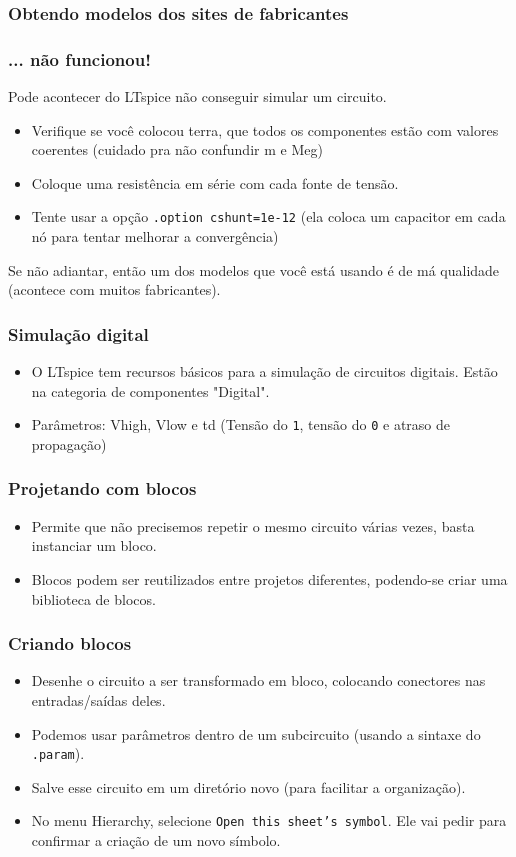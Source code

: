 \documentclass{beamer}
\begin{document}
\begin{frame}
\frametitle{Obtendo modelos dos sites de fabricantes}
\end{frame}

\begin{frame}
\frametitle{... não funcionou!}
Pode acontecer do LTspice não conseguir simular um circuito.
\begin{itemize}
\item Verifique se você colocou terra, que todos os componentes estão com valores coerentes (cuidado pra não confundir m e Meg)
\item Coloque uma resistência em série com cada fonte de tensão.
\item Tente usar a opção \texttt{.option cshunt=1e-12} (ela coloca um capacitor em cada nó para tentar melhorar a convergência)
\end{itemize}
Se não adiantar, então um dos modelos que você está usando é de má qualidade (acontece com muitos fabricantes).
\end{frame}


\begin{frame}
\frametitle{Simulação digital}
\begin{itemize}
\item O LTspice tem recursos básicos para a simulação de circuitos digitais. Estão na categoria de componentes "Digital".
\item Parâmetros: Vhigh, Vlow e td (Tensão do \texttt{1}, tensão do \texttt{0} e atraso de propagação)
\end{itemize}
\end{frame}

\begin{frame}
\frametitle{Projetando com blocos}
\begin{itemize}
\item Permite que não precisemos repetir o mesmo circuito várias vezes, basta instanciar um bloco.
\item Blocos podem ser reutilizados entre projetos diferentes, podendo-se criar uma biblioteca de blocos.
\end{itemize}
\end{frame}

\begin{frame}
\frametitle{Criando blocos}
\begin{itemize}
\item Desenhe o circuito a ser transformado em bloco, colocando conectores nas entradas/saídas deles.
\item Podemos usar parâmetros dentro de um subcircuito (usando a sintaxe do \texttt{.param}).
\item Salve esse circuito em um diretório novo (para facilitar a organização).
\item No menu Hierarchy, selecione \texttt{Open this sheet's symbol}. Ele vai pedir para confirmar a criação de um novo símbolo.
\end{itemize}
\end{frame}
\end{document}
